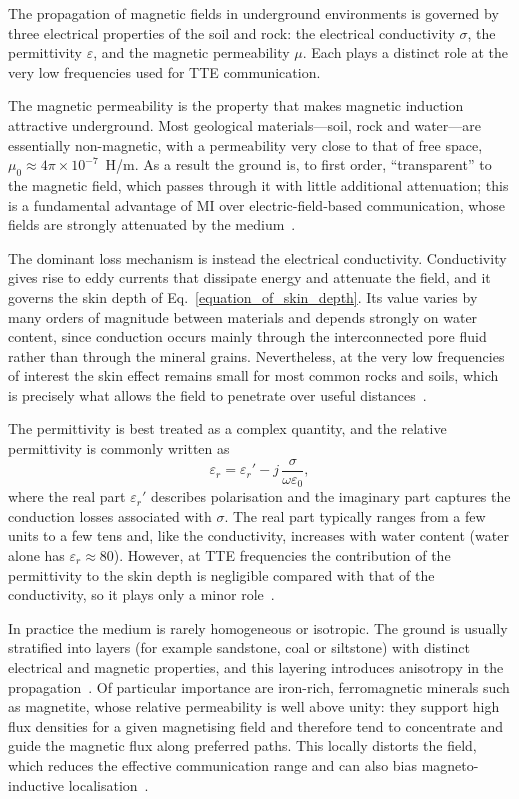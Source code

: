 The propagation of magnetic fields in underground environments is governed by
three electrical properties of the soil and rock: the electrical conductivity
$\sigma$, the permittivity $\varepsilon$, and the magnetic permeability $\mu$. Each
plays a distinct role at the very low frequencies used for TTE communication.

The magnetic permeability is the property that makes magnetic induction attractive
underground. Most geological materials---soil, rock and water---are essentially
non-magnetic, with a permeability very close to that of free space,
$\mu_0 \approx 4\pi\times 10^{-7}$~H/m. As a result the ground is, to first order,
``transparent'' to the magnetic field, which passes through it with little
additional attenuation; this is a fundamental advantage of MI over
electric-field-based communication, whose fields are strongly attenuated by the
medium~\cite{abrudan2016}.

The dominant loss mechanism is instead the electrical conductivity. Conductivity
gives rise to eddy currents that dissipate energy and attenuate the field, and it
governs the skin depth of Eq.~\eqref{equation_of_skin_depth}. Its value varies by
many orders of magnitude between materials and depends strongly on water content,
since conduction occurs mainly through the interconnected pore fluid rather than
through the mineral grains. Nevertheless, at the very low frequencies of interest
the skin effect remains small for most common rocks and soils, which is precisely
what allows the field to penetrate over useful distances~\cite{abrudan2016}.

The permittivity is best treated as a complex quantity, and the relative
permittivity is commonly written as
\begin{equation}
    \varepsilon_r = \varepsilon_r' - j\,\frac{\sigma}{\omega \varepsilon_0},
    \label{eq:complex_permittivity}
\end{equation}
where the real part $\varepsilon_r'$ describes polarisation and the imaginary part
captures the conduction losses associated with $\sigma$. The real part typically
ranges from a few units to a few tens and, like the conductivity, increases with
water content (water alone has $\varepsilon_r \approx 80$). However, at TTE
frequencies the contribution of the permittivity to the skin depth is negligible
compared with that of the conductivity, so it plays only a minor
role~\cite{abrudan2016}.

In practice the medium is rarely homogeneous or isotropic. The ground is usually
stratified into layers (for example sandstone, coal or siltstone) with distinct
electrical and magnetic properties, and this layering introduces anisotropy in the
propagation~\cite{9205830}. Of particular importance are iron-rich, ferromagnetic
minerals such as magnetite, whose relative permeability is well above unity: they
support high flux densities for a given magnetising field and therefore tend to
concentrate and guide the magnetic flux along preferred paths. This locally
distorts the field, which reduces the effective communication range and can also
bias magneto-inductive localisation~\cite{abrudan2016, ma2025survey}.


